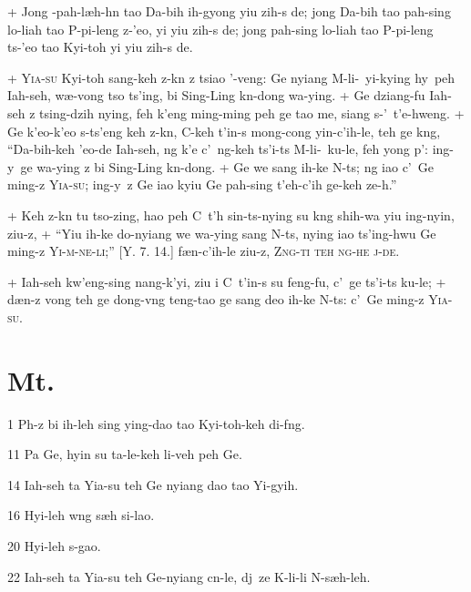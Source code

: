 \par
+	Jong \OO-pah-l\ae h-h\e n tao Da-bih ih-gy\y ong yiu zih-s de; jong Da-bih tao pah-sing lo-liah tao P\oo-pi-leng z-'eo, yi yiu zih-s de; jong pah-sing lo-liah tao P\oo-pi-leng ts-'eo tao Kyi-toh yi yiu zih-s de.
\par
+	\textsc{Yia-su} Kyi-toh sang-keh z-k\e n z tsiao '\oo-veng: Ge nyiang M\oo-li-\oo\ yi-kying hy\y\ peh Iah-seh, w\ae-vong tso ts'ing, bi Sing-Ling k\e n-dong wa-ying.
+	Ge dziang-fu Iah-seh z tsing-dzih nying, feh k'eng ming-ming peh ge tao me, siang s-'\oo\ t'e-hweng.
+	Ge k'eo-k'eo s-ts'eng keh z-k\e n, C\y-keh t'in-s mong-cong yin-c'ih-le, teh ge k\oo ng, ``Da-bih-keh 'eo-de Iah-seh, ng k'e c'\y\ ng-keh ts'i-ts M\oo-li-\oo\ ku-le, feh y\y ong p'\oo: ing-y\y\ ge wa-ying z bi Sing-Ling k\e n-dong.
+	Ge we sang ih-ke N-ts; ng iao c'\y\ Ge ming-z \textsc{Yia-su}; ing-y\y\ z Ge iao kyiu Ge pah-sing t'eh-c'ih ge-keh ze-\oo h.''
\par
+	Keh z-k\e n tu tso-zing, hao peh C\y\ t'\oo h sin-ts-nying su k\oo ng shih-wa yiu ing-nyin, ziu-z,
+	``Yiu ih-ke do-nyiang we wa-ying sang N-ts, nying iao ts'ing-hwu Ge ming-z \textsc{Yi-m\oo-ne-li};'' [Y. 7. 14.] f\ae n-c'ih-le ziu-z, \textsc{Z\oo ng-ti teh ng\oo-he j\y-de}.
\par
+	Iah-seh kw'eng-sing nang-k'yi, ziu i C\y\ t'in-s su feng-fu, c'\y\ ge ts'i-ts ku-le;
+	d\ae n-z vong teh ge dong-v\oo ng teng-tao ge sang deo ih-ke N-ts: c'\y\ Ge ming-z \textsc{Yia-su}.



\section{Mt.}%

\begin{sAbstract}
	\item[1] P\oo h-z bi ih-leh sing ying-dao tao Kyi-toh-keh di-f\oo ng.
	\item[11] Pa Ge, hyin su ta-le-keh li-veh peh Ge.
	\item[14] Iah-seh ta Yia-su teh Ge nyiang dao tao Yi-gyih.
	\item[16] Hyi-leh w\oo ng s\ae h si-lao.
	\item[20] Hyi-leh s-gao.
	\item[22] Iah-seh ta Yia-su teh Ge-nyiang c\y n-le, dj\y\ ze K\oo-li-li N\oo-s\ae h-leh.
\end{sAbstract}

